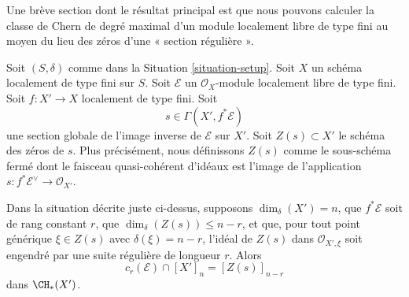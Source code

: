 \noindent
Une brève section dont le résultat principal est que nous pouvons calculer la
classe de Chern de degré maximal d'un module localement libre de type fini au moyen du
lieu des zéros d'une « section régulière ».

\medskip\noindent
Soit $(S, \delta)$ comme dans la Situation \ref{situation-setup}. Soit $X$ un schéma
localement de type fini sur $S$. Soit $\mathcal{E}$ un
$\mathcal{O}_X$-module localement libre de type fini. Soit $f : X' \to X$ localement de type fini. Soit
$$
s \in \Gamma(X', f^*\mathcal{E})
$$
une section globale de l'image inverse de $\mathcal{E}$ sur $X'$. Soit
$Z(s) \subset X'$ le schéma des zéros de $s$. Plus précisément, nous définissons
$Z(s)$ comme le sous-schéma fermé dont le faisceau quasi-cohérent
d'idéaux est l'image de l'application
$s : f^*\mathcal{E}^\vee \to \mathcal{O}_{X'}$.

\begin{lemma}
\label{lemma-top-chern-class}
Dans la situation décrite juste ci-dessus, supposons $\dim_\delta(X') = n$,
que $f^*\mathcal{E}$ soit de rang constant $r$, que
$\dim_\delta(Z(s)) \leq n - r$, et que, pour tout point générique
$\xi \in Z(s)$ avec $\delta(\xi) = n - r$, l'idéal de $Z(s)$
dans $\mathcal{O}_{X', \xi}$ soit engendré par une suite régulière
de longueur $r$. Alors
$$
c_r(\mathcal{E}) \cap [X']_n = [Z(s)]_{n - r}
$$
dans $\CH_*(X')$.
\end{lemma}

